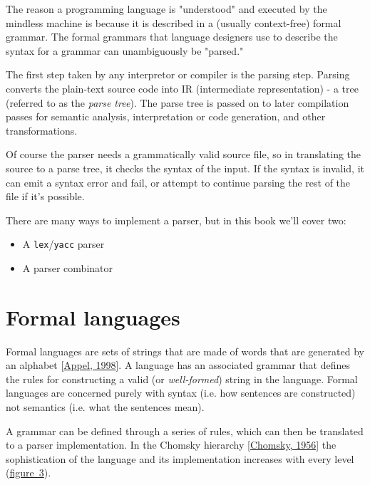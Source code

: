 \documentclass{book}
\newcommand{\Scribtexttt}[1]{{\texttt{#1}}}
\newlength{\stabLeft}
\newcommand{\atItemizeStart}[0]{\addtolength{\stabLeft}{\labelsep}
                                \addtolength{\stabLeft}{\labelwidth}}
\let\SOriginalthesubsubsection\thesubsubsection
\newcommand{\Ssubsection}[2]{\subsection[#1]{#2}\let\thesubsubsection\SOriginalthesubsubsection}
\newcommand{\FigureRef}[2]{#1}
\renewcommand{\Ssubsection}[2]{\section[#1]{#2}}
\begin{document}
The reason a programming language is "understood" and executed by the
mindless machine is because it is described in a (usually
context{-}free) formal grammar. The formal grammars that language designers
use to describe the syntax for a grammar can unambiguously be "parsed."

The first step taken by any interpretor or compiler is the parsing step.
Parsing converts the plain{-}text source code into IR (intermediate
representation) {-} a tree (referred to as the \textit{parse tree}). The
parse tree is passed on to later compilation passes for semantic analysis,
interpretation or code generation, and other transformations.

Of course the parser needs a grammatically valid source file, so in
translating the source to a parse tree, it checks the syntax of the input.
If the syntax is invalid, it can emit a syntax error and fail, or attempt
to continue parsing the rest of the file if it{'}s possible.

There are many ways to implement a parser, but in this book we{'}ll cover
two:

\begin{itemize}\atItemizeStart

\item A \Scribtexttt{lex}/\Scribtexttt{yacc} parser

\item A parser combinator\end{itemize}

\Ssubsection{Formal languages}{Formal languages}\label{t:x28part_x22Formalx5flanguagesx22x29}

Formal languages are sets of strings that are made of words that are
generated by an alphabet [\hyperref[t:x28cite_x22Appelx2c_1998x22x29]{Appel, 1998}]. A language has an
associated grammar that defines the rules for constructing a valid (or
\textit{well{-}formed}) string in the language. Formal languages are
concerned purely with syntax (i.e. how sentences are constructed) not
semantics (i.e. what the sentences mean).

A grammar can be defined through a series of rules, which can then be
translated to a parser implementation. In the Chomsky hierarchy
[\hyperref[t:x28cite_x22Chomskyx2c_1956x22x29]{Chomsky, 1956}] the sophistication of the language and its
implementation increases with every level (\hyperref[t:x28counter_x28x22figurex22_x22chx22x29x29]{figure~\FigureRef{3}{t:x28counter_x28x22figurex22_x22chx22x29x29}}).
\end{document}
